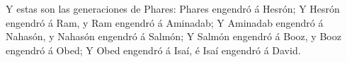  Y estas son las generaciones de Phares: Phares engendró á
Hesrón;  Y Hesrón engendró á Ram, y Ram engendró á
Aminadab;  Y Aminadab engendró á Nahasón, y Nahasón
engendró á Salmón;  Y Salmón engendró á Booz, y Booz
engendró á Obed;  Y Obed engendró á Isaí, é Isaí engendró á
David.
